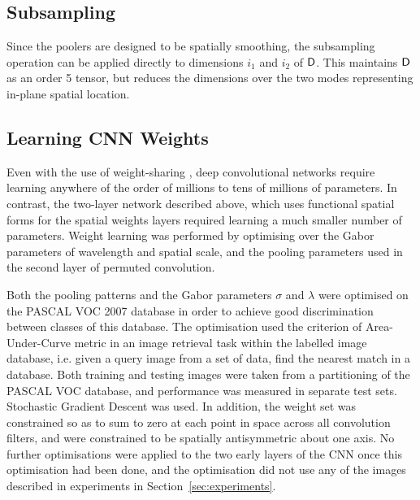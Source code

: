 
\subsection{Subsampling}
Since the poolers are designed to be spatially smoothing, the subsampling operation can be applied directly to dimensions $i_1$ and $i_2$ of $\mathsf{D}$. This maintains $\mathsf{D}$ as an order 5 tensor, but reduces the dimensions over the two modes representing in-plane spatial location. 


\subsection{Learning CNN Weights}
Even with the use of weight-sharing \cite{lecun1995convolutional}, deep convolutional networks require learning anywhere of the order of millions to tens of millions of parameters. In contrast, the two-layer network described above, which uses functional spatial forms for the spatial weights layers required learning a much smaller number of parameters.  Weight learning was performed by optimising over the Gabor parameters of wavelength and spatial scale, and the pooling parameters used in the second layer of permuted convolution.

Both the pooling patterns and the Gabor parameters $\sigma$ and $\lambda$ were optimised on the PASCAL VOC 2007 database \cite{everingham2010pascal} in order to achieve good discrimination between classes of this database. The optimisation used the criterion of Area-Under-Curve metric in an image retrieval task within the labelled image database, i.e. given a query image from a set of data, find the nearest match in a database.  Both training and testing images were taken from a partitioning of the PASCAL VOC database, and performance was measured in separate test sets.  Stochastic Gradient Descent was used. In addition, the weight set was constrained so as to sum to zero at each point in space across all convolution filters, and were constrained to be spatially antisymmetric about one axis.  No further optimisations were applied to the two early layers of the CNN once this optimisation had been done, and the optimisation did not use any of the images described in experiments in Section~\ref{sec:experiments}.

